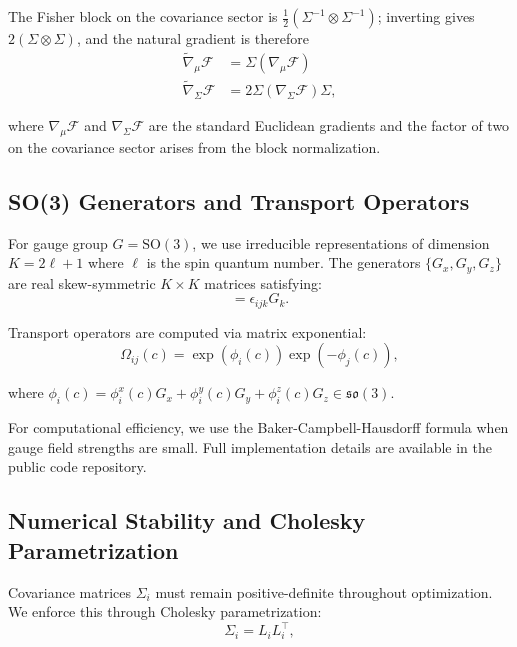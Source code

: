\documentclass[11pt]{article}
\begin{document}
The Fisher block on the covariance sector is $\tfrac{1}{2}(\Sigma^{-1} \otimes \Sigma^{-1})$; inverting gives $2(\Sigma \otimes \Sigma)$, and the natural gradient is therefore
\begin{align}
\tilde{\nabla}_\mu \mathcal{F} &= \Sigma (\nabla_\mu \mathcal{F}) \\
\tilde{\nabla}_\Sigma \mathcal{F} &= 2\Sigma (\nabla_\Sigma \mathcal{F}) \Sigma,
\end{align}

where $\nabla_\mu \mathcal{F}$ and $\nabla_\Sigma \mathcal{F}$ are the standard Euclidean gradients and the factor of two on the covariance sector arises from the block normalization.

\subsection{SO(3) Generators and Transport Operators}

For gauge group $G = \mathrm{SO}(3)$, we use irreducible representations of dimension $K = 2\ell + 1$ where $\ell$ is the spin quantum number. The generators $\{G_x, G_y, G_z\}$ are real skew-symmetric $K \times K$ matrices satisfying:
\begin{equation}
[G_i, G_j] = \epsilon_{ijk} G_k.
\end{equation}

Transport operators are computed via matrix exponential:
\begin{equation}
\Omega_{ij}(c) = \exp(\phi_i(c)) \exp(-\phi_j(c)),
\end{equation}

where $\phi_i(c) = \phi_i^x(c) G_x + \phi_i^y(c) G_y + \phi_i^z(c) G_z \in \mathfrak{so}(3)$.

For computational efficiency, we use the Baker-Campbell-Hausdorff formula when gauge field strengths are small. Full implementation details are available in the public code repository.

\subsection{Numerical Stability and Cholesky Parametrization}

Covariance matrices $\Sigma_i$ must remain positive-definite throughout optimization. We enforce this through Cholesky parametrization:
\begin{equation}
\Sigma_i = L_i L_i^\top,
\end{equation}
\end{document}
